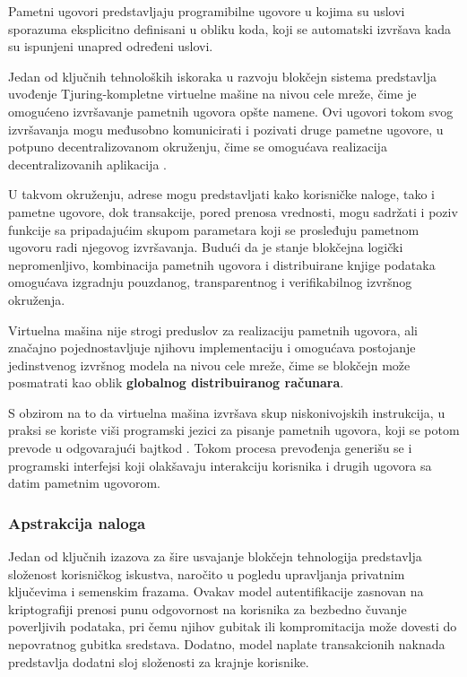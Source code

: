 \begin{definicija}
Pametni ugovori predstavljaju programibilne ugovore u kojima su uslovi sporazuma eksplicitno definisani u obliku koda, koji se automatski izvršava kada su ispunjeni unapred određeni uslovi.
\end{definicija}

Jedan od ključnih tehnoloških iskoraka u razvoju blokčejn sistema predstavlja uvođenje Tjuring-kompletne virtuelne mašine na nivou cele mreže, čime je omogućeno izvršavanje pametnih ugovora opšte namene. Ovi ugovori tokom svog izvršavanja mogu međusobno komunicirati i pozivati druge pametne ugovore, u potpuno decentralizovanom okruženju, čime se omogućava realizacija decentralizovanih aplikacija .

U takvom okruženju, adrese mogu predstavljati kako korisničke naloge, tako i pametne ugovore, dok transakcije, pored prenosa vrednosti, mogu sadržati i poziv funkcije sa pripadajućim skupom parametara koji se prosleđuju pametnom ugovoru radi njegovog izvršavanja. Budući da je stanje blokčejna logički nepromenljivo, kombinacija pametnih ugovora i distribuirane knjige podataka omogućava izgradnju pouzdanog, transparentnog i verifikabilnog izvršnog okruženja.

Virtuelna mašina nije strogi preduslov za realizaciju pametnih ugovora, ali značajno pojednostavljuje njihovu implementaciju i omogućava postojanje jedinstvenog izvršnog modela na nivou cele mreže, čime se blokčejn može posmatrati kao oblik \textbf{globalnog distribuiranog računara}.

S obzirom na to da virtuelna mašina izvršava skup niskonivojskih  instrukcija, u praksi se koriste viši programski jezici za pisanje pametnih ugovora, koji se potom prevode u odgovarajući bajtkod . Tokom procesa prevođenja generišu se i programski interfejsi koji olakšavaju interakciju korisnika i drugih ugovora sa datim pametnim ugovorom.

\subsubsection{Apstrakcija naloga}
Jedan od ključnih izazova za šire usvajanje blokčejn tehnologija predstavlja složenost korisničkog iskustva, naročito u pogledu upravljanja privatnim ključevima i semenskim frazama. Ovakav model autentifikacije zasnovan na kriptografiji prenosi punu odgovornost na korisnika za bezbedno čuvanje poverljivih podataka, pri čemu njihov gubitak ili kompromitacija može dovesti do nepovratnog gubitka sredstava. Dodatno, model naplate transakcionih naknada predstavlja dodatni sloj složenosti za krajnje korisnike.

